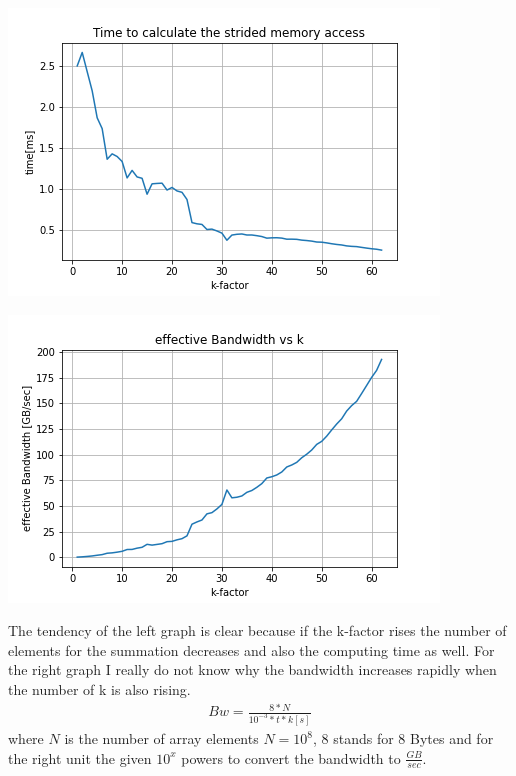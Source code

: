 \documentclass[11pt,a4paper]{article}
\begin{document}
\begin{minipage}[t]{0.49\textwidth}
	\includegraphics[width=\textwidth]{Bilder/Runtime_stride.png}
\end{minipage}
\begin{minipage}[t]{0.49\textwidth}
	\includegraphics[width=\textwidth]{Bilder/Bandwidth_stride.png}
\end{minipage}

\noindent
The tendency of the left graph is clear because if the k-factor rises the number of elements for the summation decreases and also the computing time as well. For the right graph I really do not know why the bandwidth increases rapidly when the number of k is also rising.
\begin{align*}
Bw = \frac{8 * N}{10^{-3} * t * k [s]}
\end{align*}
where $N$ is the number of array elements $N = 10^8$, 8 stands for 8 Bytes and for the right unit the given $10^x$ powers to convert the bandwidth to $\frac{GB}{sec}$.
\newpage
\end{document}
